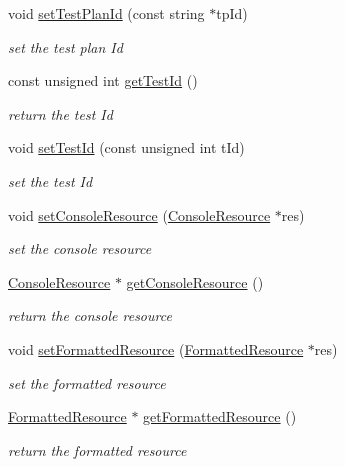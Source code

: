 \begin{DoxyCompactItemize}
void \hyperlink{classit_1_1testbench_1_1data_1_1Report_aead163e559989efb81d17c227d07f2a5}{set\-Test\-Plan\-Id} (const string $\ast$tp\-Id)
\begin{DoxyCompactList}\small\item\em set the test plan Id \end{DoxyCompactList}\item 
const unsigned int \hyperlink{classit_1_1testbench_1_1data_1_1Report_afb1db43a0171d0df0eaa528f06bcd12e}{get\-Test\-Id} ()
\begin{DoxyCompactList}\small\item\em return the test Id \end{DoxyCompactList}\item 
void \hyperlink{classit_1_1testbench_1_1data_1_1Report_a0ed5ac70a368a7b9036dab9adafdc5ec}{set\-Test\-Id} (const unsigned int t\-Id)
\begin{DoxyCompactList}\small\item\em set the test Id \end{DoxyCompactList}\item 
void \hyperlink{classit_1_1testbench_1_1data_1_1Report_a2b4a5cc3e58bc2ac6ffdc78cb1764b65}{set\-Console\-Resource} (\hyperlink{structit_1_1testbench_1_1data_1_1ConsoleResource}{Console\-Resource} $\ast$res)
\begin{DoxyCompactList}\small\item\em set the console resource \end{DoxyCompactList}\item 
\hyperlink{structit_1_1testbench_1_1data_1_1ConsoleResource}{Console\-Resource} $\ast$ \hyperlink{classit_1_1testbench_1_1data_1_1Report_af5cf6e8ed291e102fc7a2b3a80829352}{get\-Console\-Resource} ()
\begin{DoxyCompactList}\small\item\em return the console resource \end{DoxyCompactList}\item 
void \hyperlink{classit_1_1testbench_1_1data_1_1Report_aa7a80b0215ab29a328895311a974ed0d}{set\-Formatted\-Resource} (\hyperlink{structit_1_1testbench_1_1data_1_1FormattedResource}{Formatted\-Resource} $\ast$res)
\begin{DoxyCompactList}\small\item\em set the formatted resource \end{DoxyCompactList}\item 
\hyperlink{structit_1_1testbench_1_1data_1_1FormattedResource}{Formatted\-Resource} $\ast$ \hyperlink{classit_1_1testbench_1_1data_1_1Report_a14037b1ced98bd5a3f11cf3c5fc625ad}{get\-Formatted\-Resource} ()
\begin{DoxyCompactList}\small\item\em return the formatted resource \end{DoxyCompactList}\end{DoxyCompactItemize}
